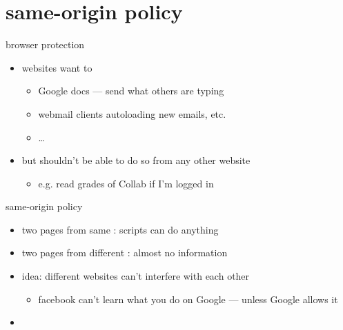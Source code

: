 \section{same-origin policy}

\begin{frame}{browser protection}
    \begin{itemize}
        \item websites want to 
    \begin{itemize}
        \item Google docs --- send what others are typing
        \item webmail clients autoloading new emails, etc.
        \item \ldots
    \end{itemize}
    \item but shouldn't be able to do so from any other website
        \begin{itemize}
        \item e.g. read grades of Collab if I'm logged in
        \end{itemize}
    \end{itemize}
\end{frame}

\begin{frame}{same-origin policy}
    \begin{itemize}
        \item two pages from same : scripts can do anything
        \item two pages from different : almost no information
            \vspace{.5cm}
        \item idea: different websites can't interfere with each other
            \begin{itemize}
            \item facebook can't learn what you do on Google --- unless Google allows it
            \end{itemize}
        \item {}
    \end{itemize}
\end{frame}

